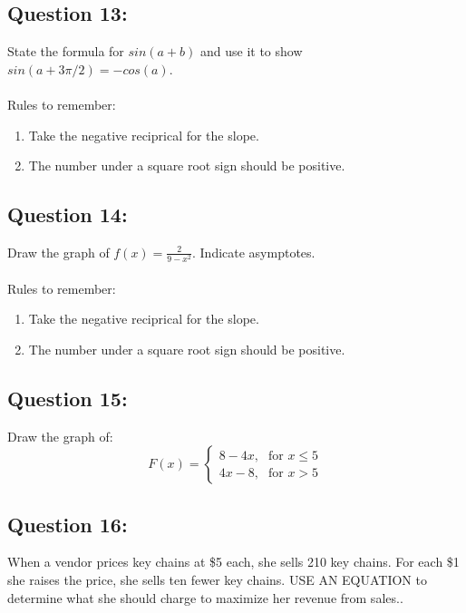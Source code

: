 \documentclass[12pt, letterpaper]{article}
\begin{document}
\subsection{Question 13:}
  State the formula for $sin(a+b)$ and use it to show $sin(a+3\pi/2)=-cos(a)$.
  \\\\
  Rules to remember:
  \begin{enumerate}
    \item Take the negative reciprical for the slope.
    \item The number under a square root sign should be positive.
  \end{enumerate}

\subsection{Question 14:}
  Draw the graph of $f(x)=\frac{2}{9-x^2}$. Indicate asymptotes.
  \\\\
  Rules to remember:
  \begin{enumerate}
    \item Take the negative reciprical for the slope.
    \item The number under a square root sign should be positive.
  \end{enumerate}

\subsection{Question 15:}
  Draw the graph of:
  \[F(x) =
    \begin{cases}
        \text{$8-4x$,} & \text{for $x\le 5$} \\
        \text{$4x-8$,} & \text{for $x>5$}
    \end{cases}\]

\subsection{Question 16:}
When a vendor prices key chains at \$5 each, she sells 210 key chains. For each \$1 she raises the price, she sells ten fewer key chains. USE AN EQUATION to determine what she should charge to maximize her revenue from sales..
  \\\\
\end{document}
